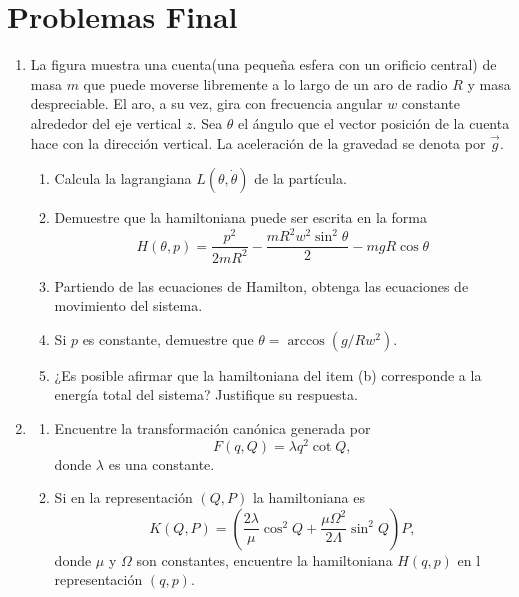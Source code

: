 \documentclass[../main]{subfiles}
\begin{document}
\section*{Problemas Final}
\begin{enumerate}
    \item La figura muestra una cuenta(una pequeña esfera con un orificio central) de masa $m$ que puede moverse libremente a lo largo de un aro de radio $R$ y masa despreciable. El aro, a su vez, gira con frecuencia angular $w$ constante alrededor del eje vertical $z$. Sea $\theta$ el ángulo que el vector posición de la cuenta hace con la dirección vertical. La aceleración de la gravedad se denota por $\vec{g}$.
    \begin{enumerate}[label=(\alph*)]
        \item Calcula la lagrangiana $L(\theta, \dot{\theta})$ de la partícula.
        \item Demuestre que la hamiltoniana puede ser escrita en la forma 
        \begin{equation*}
            H(\theta, p)=\dfrac{p^2}{2mR^2}-\dfrac{mR^2 w^2 \sin^2 \theta}{2}-mgR \cos \theta
        \end{equation*}
        \item Partiendo de las ecuaciones de Hamilton, obtenga las ecuaciones de movimiento del sistema.
        \item Si $p$ es constante, demuestre que $\theta=\arccos (g/Rw^2)$.
        \item ¿Es posible afirmar que la hamiltoniana del item (b) corresponde a la energía total del sistema? Justifique su respuesta.
    \end{enumerate}
    \item 
    \begin{enumerate}[label=(\alph*)]
        \item Encuentre la transformación canónica generada por
        \begin{equation*}
            F(q, Q)=\lambda q^2 \cot Q,
        \end{equation*}
        donde $\lambda$ es una constante.
        \item Si en la representación $(Q, P)$ la hamiltoniana es 
        \begin{equation*}
            K(Q, P)=\left(\dfrac{2\lambda}{\mu}\cos^2 Q+\dfrac{\mu\Omega^2}{2\Lambda}\sin^2 Q\right)P,
        \end{equation*}
        donde $\mu$ y $\Omega$ son constantes, encuentre la hamiltoniana $H(q, p)$ en l representación $(q, p)$.

\end{enumerate}
\end{enumerate}
\end{document}
